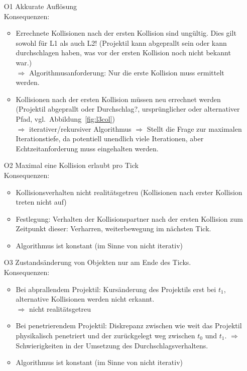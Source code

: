 \begin{itemize}
	\item[O1] Akkurate Auflösung\\
		Konsequenzen:
		\begin{itemize}
			\item Errechnete Kollisionen nach der ersten Kollision sind ungültig. Dies gilt sowohl für L1 als auch L2! (Projektil kann abgeprallt sein oder kann durchschlagen haben, was vor der ersten Kollision noch nicht bekannt war.)\\
				$\Rightarrow$ Algorithmusanforderung: Nur die erste Kollision muss ermittelt werden.
			\item Kollisionen nach der ersten Kollision müssen neu errechnet werden (Projektil abgeprallt oder Durchschlag?, ursprünglicher oder alternativer Pfad, vgl.~Abbildung~\ref{fig:l3col})\\
				$\Rightarrow$ iterativer/rekursiver Algorithmus $\Rightarrow$ Stellt die Frage zur maximalen Iterationstiefe, da potentiell unendlich viele Iterationen, aber Echtzeitanforderung muss eingehalten werden.
		\end{itemize}

	\item[O2] Maximal eine Kollision erlaubt pro Tick\\
		Konsequenzen:
		\begin{itemize}
			\item Kollisionsverhalten nicht realitätsgetreu (Kollisionen nach erster Kollision treten nicht auf)
			\item Festlegung: Verhalten der Kollisionspartner nach der ersten Kollision zum Zeitpunkt dieser: Verharren, weiterbewegung im nächsten Tick.
			\item Algorithmus ist konstant (im Sinne von nicht iterativ)
		\end{itemize}
	\item[O3] Zustandsänderung von Objekten nur am Ende des Ticks.\\
		Konsequenzen:
		\begin{itemize}
			\item Bei abprallendem Projektil: Kursänderung des Projektils erst bei $t_1$, alternative Kollisionen werden nicht erkannt.\\
				$\Rightarrow$ nicht realitätsgetreu
			\item Bei penetrierendem Projektil: Diskrepanz zwischen wie weit das Projektil physikalisch penetriert und der zurückgelegt weg zwischen $t_0$ und $t_1$.
				$\Rightarrow$ Schwierigkeiten in der Umsetzung des Durchschlagsverhaltens.
			\item Algorithmus ist konstant (im Sinne von nicht iterativ)
		\end{itemize}
\end{itemize}

